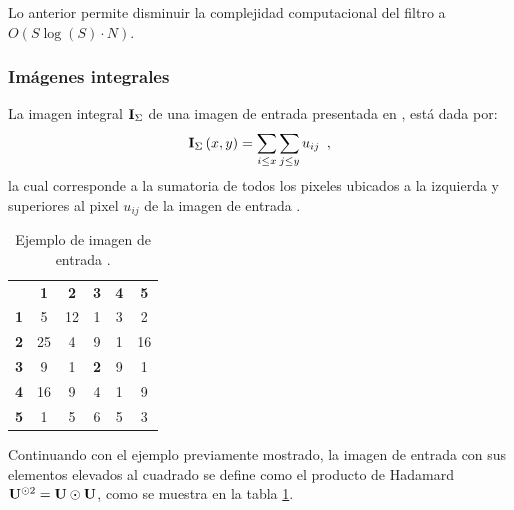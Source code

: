 Lo anterior permite disminuir la complejidad computacional del filtro a $O(S\log(S) \cdot N)$.
 
\subsubsection{Imágenes integrales}


La imagen integral $\mathbf{I}_{\Sigma}$ de una imagen de entrada  presentada en \cite{viola2001robust}, está dada por: 
\begin{equation}
\mathbf{I}_{\Sigma}\left(x,y\right)=\sum_{i\leq x}\sum_{j\leq y}u_{ij} \enspace ,
\end{equation}
la cual corresponde a la sumatoria de todos los  pixeles ubicados a la izquierda y superiores al pixel $u_{ij}$ de la imagen de entrada .

\begin{table}
\begin{center}
\caption{Ejemplo de imagen de entrada .\label{table:imageExample2}}

\renewcommand{\arraystretch}{1.4}
\setlength\tabcolsep{3pt}

{
\begin{tabular}{cc|ccc|c}
 & \multicolumn{1}{c}{\textbf{1}} & \textbf{2} & \textbf{3} & \multicolumn{1}{c}{\textbf{4}} & \textbf{5}\tabularnewline
\textbf{1} & \multicolumn{1}{c}{5} & 12 & 1 & \multicolumn{1}{c}{3} & 2\tabularnewline
\cline{3-5} 
\textbf{2} & 25 & 4 & 9 & 1 & 16\tabularnewline
\textbf{3} & 9 & 1 & \textbf{2} & 9 & 1\tabularnewline
\textbf{4} & 16 & 9 & 4 & 1 & 9\tabularnewline
\cline{3-5} 
\textbf{5} & \multicolumn{1}{c}{1} & 5 & 6 & \multicolumn{1}{c}{5} & 3\tabularnewline
\end{tabular}
}
\par\end{center} 
\end{table}


Continuando con el ejemplo previamente mostrado, la imagen de entrada  con sus elementos elevados al cuadrado se define como el producto de Hadamard $\mathbf{U}^{\odot 2} = \mathbf{U} \odot \mathbf{U}$, como se muestra en la tabla \ref{table:imageExample2}. 


